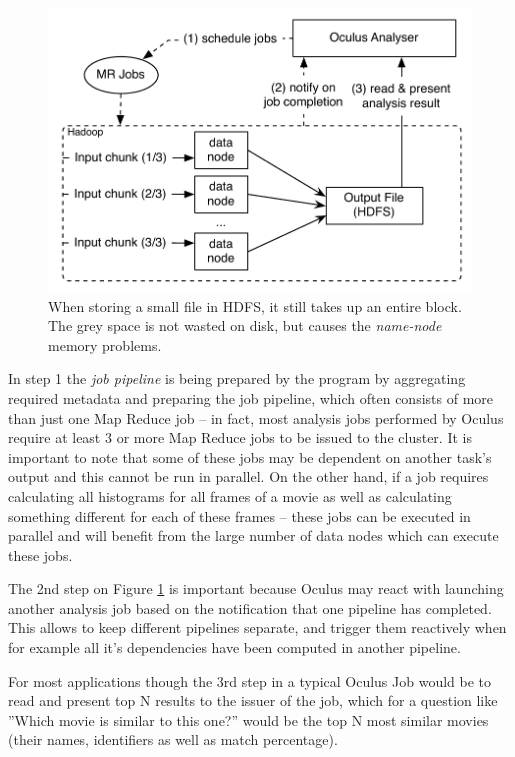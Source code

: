 \begin{figure}[ch!]
  \centering
  \includegraphics[scale=0.9]{diagrams/analyser-high-level.pdf}
  \caption{When storing a small file in HDFS, it still takes up an entire block. The grey space is not wasted on disk, but causes the \textit{name-node} memory problems.}
  \label{fig:analyser-high-level}
\end{figure}

In step 1 the \textit{job pipeline} is being prepared by the program by aggregating required metadata and preparing the job pipeline, which often consists of more than just one Map Reduce job -- in fact, most analysis jobs performed by Oculus require at least 3 or more Map Reduce jobs to be issued to the cluster. It is important to note that some of these jobs may be dependent on another task's output and this cannot be run in parallel. On the other hand, if a job requires calculating all histograms for all frames of a movie as well as calculating something different for each of these frames -- these jobs can be executed in parallel and will benefit from the large number of data nodes which can execute these jobs.

The 2nd step on Figure \ref{fig:analyser-high-level} is important because Oculus may react with launching another analysis job based on the notification that one pipeline has completed. This allows to keep different pipelines separate, and trigger them reactively when for example all it's dependencies have been computed in another pipeline.

For most applications though the 3rd step in a typical Oculus Job would be to read and present top N results to the issuer of the job, which for a question like ''Which movie is similar to this one?'' would be the top N most similar movies (their names, identifiers as well as match percentage).

